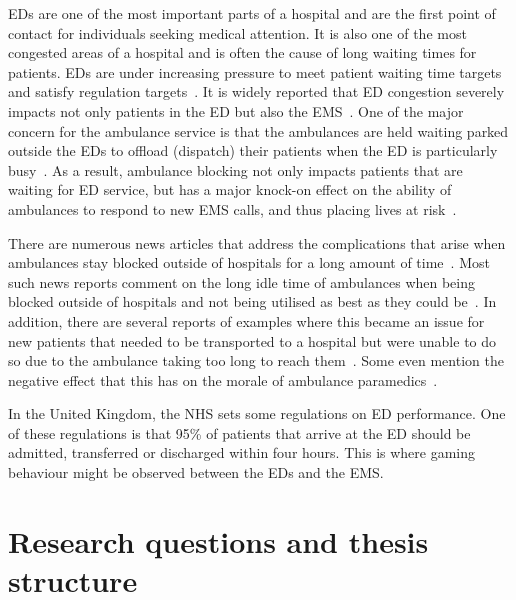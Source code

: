 EDs are one of the most important parts of a hospital and are the first point
of contact for individuals seeking medical attention.
It is also one of the most congested areas of a hospital and is often the
cause of long waiting times for patients.
EDs are under increasing pressure to meet patient waiting time targets and
satisfy regulation targets~\cite{EmergencyDepartmentWinterPressures}.
It is widely reported that ED congestion severely impacts not only patients in
the ED but also the EMS~\cite{mirror, bmj, thenews}.
One of the major concern for the ambulance service is that the ambulances are
held waiting parked outside the EDs to offload (dispatch) their patients when
the ED is particularly busy~\cite{clarey2014ambulance}.
As a result, ambulance blocking not only impacts patients that are waiting for
ED service, but has a major knock-on effect on the ability of ambulances to
respond to new EMS calls, and thus placing lives at risk~\cite{eastanglia}.

There are numerous news articles that address the complications that arise when
ambulances stay blocked outside of hospitals for a long amount of
time~\cite{dailyrecords, staffordshirelive}.
Most such news reports comment on the long idle time of ambulances when
being blocked outside of hospitals and not being utilised as best as they
could be~\cite{herefordtimes}.
In addition, there are several reports of examples where this became an issue
for new patients that needed to be transported to a hospital but were unable
to do so due to the ambulance taking too long to reach
them~\cite{southwalesargus}.
Some even mention the negative effect that this has on the morale of ambulance
paramedics~\cite{bbcwales}.

In the United Kingdom, the NHS sets some regulations on ED performance.
One of these regulations is that 95\% of patients that arrive at the ED should
be admitted, transferred or discharged within four hours.
This is where gaming behaviour might be observed between the EDs and the EMS.



\section{Research questions and thesis structure}\label{sec:intro_research}


